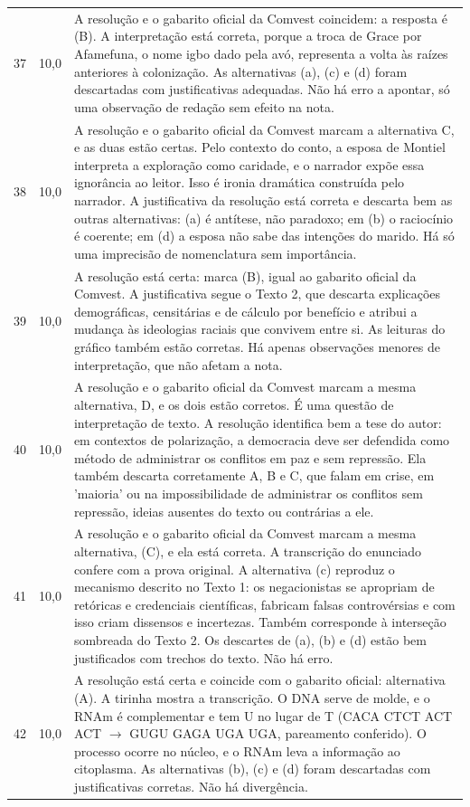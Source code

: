 \documentclass{article}%
\begin{document}
\begin{longtable}{@{}c c p{}@{}}
37 & 10,0 & A resolução e o gabarito oficial da Comvest coincidem: a resposta é (B). A interpretação está correta, porque a troca de Grace por Afamefuna, o nome igbo dado pela avó, representa a volta às raízes anteriores à colonização. As alternativas (a), (c) e (d) foram descartadas com justificativas adequadas. Não há erro a apontar, só uma observação de redação sem efeito na nota. \\
38 & 10,0 & A resolução e o gabarito oficial da Comvest marcam a alternativa C, e as duas estão certas. Pelo contexto do conto, a esposa de Montiel interpreta a exploração como caridade, e o narrador expõe essa ignorância ao leitor. Isso é ironia dramática construída pelo narrador. A justificativa da resolução está correta e descarta bem as outras alternativas: (a) é antítese, não paradoxo; em (b) o raciocínio é coerente; em (d) a esposa não sabe das intenções do marido. Há só uma imprecisão de nomenclatura sem importância. \\
39 & 10,0 & A resolução está certa: marca (B), igual ao gabarito oficial da Comvest. A justificativa segue o Texto 2, que descarta explicações demográficas, censitárias e de cálculo por benefício e atribui a mudança às ideologias raciais que convivem entre si. As leituras do gráfico também estão corretas. Há apenas observações menores de interpretação, que não afetam a nota. \\
40 & 10,0 & A resolução e o gabarito oficial da Comvest marcam a mesma alternativa, D, e os dois estão corretos. É uma questão de interpretação de texto. A resolução identifica bem a tese do autor: em contextos de polarização, a democracia deve ser defendida como método de administrar os conflitos em paz e sem repressão. Ela também descarta corretamente A, B e C, que falam em crise, em 'maioria' ou na impossibilidade de administrar os conflitos sem repressão, ideias ausentes do texto ou contrárias a ele. \\
41 & 10,0 & A resolução e o gabarito oficial da Comvest marcam a mesma alternativa, (C), e ela está correta. A transcrição do enunciado confere com a prova original. A alternativa (c) reproduz o mecanismo descrito no Texto 1: os negacionistas se apropriam de retóricas e credenciais científicas, fabricam falsas controvérsias e com isso criam dissensos e incertezas. Também corresponde à interseção sombreada do Texto 2. Os descartes de (a), (b) e (d) estão bem justificados com trechos do texto. Não há erro. \\
42 & 10,0 & A resolução está certa e coincide com o gabarito oficial: alternativa (A). A tirinha mostra a transcrição. O DNA serve de molde, e o RNAm é complementar e tem U no lugar de T (CACA CTCT ACT ACT $\to$ GUGU GAGA UGA UGA, pareamento conferido). O processo ocorre no núcleo, e o RNAm leva a informação ao citoplasma. As alternativas (b), (c) e (d) foram descartadas com justificativas corretas. Não há divergência. \\

\end{longtable}
\end{document}
